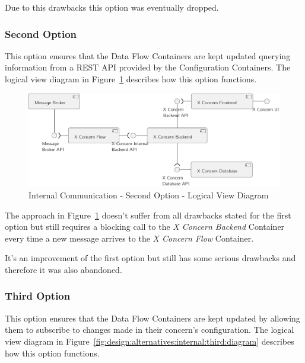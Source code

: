 Due to this drawbacks this option was eventually dropped.

\subsubsection{Second Option}
\label{subsubsec:design:alternatives:internal:second}

This option ensures that the Data Flow Containers are kept updated querying information from a \gls{REST} \gls{API} provided by the Configuration Containers. The logical view diagram in Figure~\ref{fig:design:alternatives:internal:second:diagram} describes how this option functions.

\begin{figure}[H]
   \centering
   \includegraphics[page=1,width=0.8\columnwidth]{assets/diagrams/design/alternatives/internal/alternative2.pdf}
   \caption[Internal Communication - Second Option - Logical View Diagram]{Internal Communication - Second Option - Logical View Diagram}
   \label{fig:design:alternatives:internal:second:diagram}
\end{figure}

The approach in Figure~\ref{fig:design:alternatives:internal:second:diagram} doesn't suffer from all drawbacks stated for the first option but still requires a blocking call to the \textit{X Concern Backend} Container every time a new message arrives to the \textit{X Concern Flow} Container.

It's an improvement of the first option but still has some serious drawbacks and therefore it was also abandoned.

\subsubsection{Third Option}
\label{subsubsec:design:alternatives:internal:third}

This option ensures that the Data Flow Containers are kept updated by allowing them to subscribe to changes made in their concern's configuration. The logical view diagram in Figure~\ref{fig:design:alternatives:internal:third:diagram} describes how this option functions.

